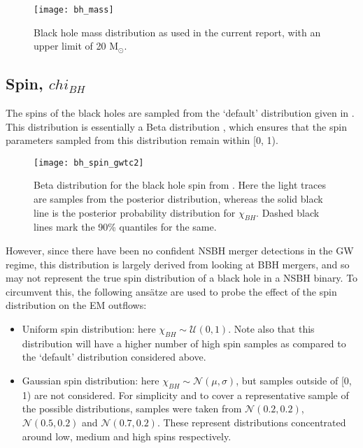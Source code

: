         \begin{figure}[H]
            \centering
            \texttt{[image: bh\_mass]}
            \caption[Black hole mass distribution with upper limit]{
                Black hole mass distribution as used in the current report, with an
                upper limit of 20 M$_\odot$.
            }
            \label{fig:bh_mass}
        \end{figure}

    \subsection{Spin, $chi_{BH}$}\label{sub:spin-dists}
        The spins of the black holes are sampled from the `default' distribution given
        in \cite{abbott_2020B}. This distribution is essentially a Beta distribution
        , which ensures that the spin parameters sampled from this distribution remain
        within [0, 1).\\

        \begin{figure}[H]
            \centering
            \texttt{[image: bh\_spin\_gwtc2]}
            \caption[Black hole spin distribution from GWTC-2]{
                Beta distribution for the  black hole spin from \cite{abbott_2020B}.
                Here the light traces are samples from the posterior distribution,
                whereas the solid black line is the posterior probability distribution
                for $\chi_{BH}$. Dashed black lines mark the 90\% quantiles for the
                same.
            }
            \label{fig:bh_spin_gwtc2}
        \end{figure}

        However, since there have been no confident NSBH merger detections in the GW
        regime, this distribution is largely derived from looking at BBH mergers, and so
        may not represent the true spin distribution of a black hole in a NSBH binary.
        To circumvent this, the following ans\"{a}tze are used to probe the effect of
        the spin distribution on the EM outflows:

        \begin{itemize}

            \item Uniform spin distribution: here $\chi_{BH} \sim \mathcal{U}(0, 1)$.
                Note also that this distribution will have a higher number of high spin
                samples as compared to the `default' distribution considered above.

            \item Gaussian spin distribution: here $\chi_{BH} \sim \mathcal{N}(\mu,
                \sigma)$, but samples outside of [0, 1) are not considered. For
                simplicity and to cover a representative sample of the possible
                distributions, samples were taken from $\mathcal{N}(0.2, 0.2)$,
                $\mathcal{N}(0.5, 0.2)$ and $\mathcal{N}(0.7, 0.2)$. These represent
                distributions concentrated around low, medium and high spins
                respectively.

        \end{itemize}

